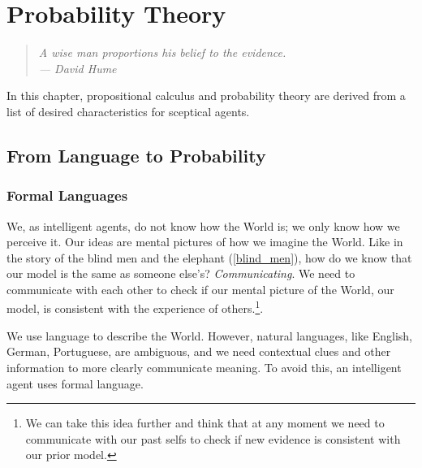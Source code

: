 \chapter{Probability Theory}\label{ch:probability}

\begin{quotation}
	\small \emph{ \flushright A wise man proportions his belief to the evidence.\\
	\flushright --- David Hume\\
	\vspace{1cm} }
\end{quotation}

In this chapter, propositional calculus and probability theory are derived from a list of desired characteristics for sceptical agents.

\section{From Language to Probability}\label{sec:language_probability}
\subsection{Formal Languages} We, as intelligent agents, do not know how the World is; we only know how we perceive it. Our ideas are mental pictures of how we imagine the World. Like in the story of the blind men and the elephant (\cref{blind_men}), how do we know that our model is the same as someone else's? \emph{Communicating}. We need to communicate with each other to check if our mental picture of the World, our model, is consistent with the experience of others.\footnote{We can take this idea further and think that at any moment we need to communicate with our past selfs to check if new evidence is consistent with our prior model.}.

We use language to describe the World. However, natural languages, like English, German, Portuguese, are ambiguous, and we need contextual clues and other information to more clearly communicate meaning. To avoid this, an intelligent agent uses formal language.

